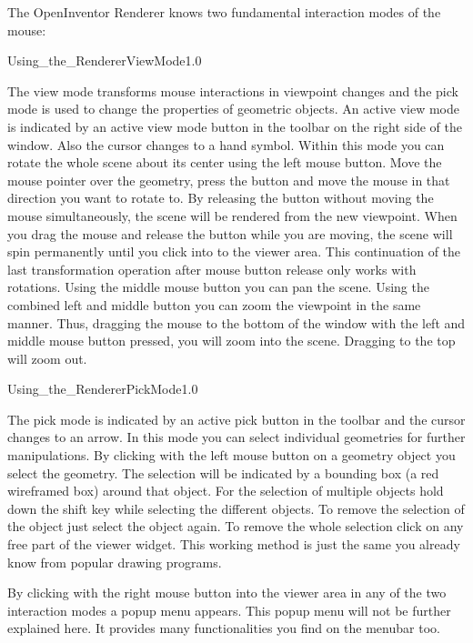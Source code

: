 The OpenInventor Renderer knows two fundamental interaction modes of the mouse: 

\begin{covimg2}{Using_the_Renderer}{ViewMode}{1.0}\end{covimg2} 
The view mode transforms mouse interactions in viewpoint changes and the pick mode is used 
to change the properties of geometric objects. An active view mode is indicated by an 
active view mode button in the toolbar on the right side of the window. Also the cursor 
changes to a hand symbol. Within this mode you can rotate the whole scene about its center 
using the left mouse button. Move the mouse pointer over the geometry, press the button and 
move the mouse in that direction you want to rotate to. By releasing the button without 
moving the mouse simultaneously, the scene will be rendered from the new viewpoint. When 
you drag the mouse and release the button while you are moving, the scene will spin 
permanently until you click into to the viewer area. This continuation of the last 
transformation operation after mouse button release only works with rotations. Using 
the middle mouse button you can pan the scene. Using the combined left and middle button 
you can zoom the viewpoint in the same manner. Thus, dragging the mouse to the bottom of 
the window with the left and middle mouse button pressed, you will zoom into the scene. 
Dragging to the top will zoom out.

\begin{covimg2}{Using_the_Renderer}{PickMode}{1.0}\end{covimg2} 
The pick mode is indicated by an active pick button  in the toolbar and the cursor changes 
to an arrow. In this mode you can select individual geometries for further manipulations. 
By clicking with the left mouse button on a geometry object you select the geometry. The 
selection will be indicated by a bounding box (a red wireframed box) around that object. 
For the selection of multiple objects hold down the shift key while selecting the
different objects. To remove the selection of the object just select the object again. 
To remove the whole selection click on any free part of the viewer widget. This working 
method is just the same you already know from popular drawing programs. 

By clicking with the right mouse button into the viewer area in any of the two interaction 
modes a popup menu appears. This popup menu will not be further explained here. It provides 
many functionalities you find on the menubar too.




